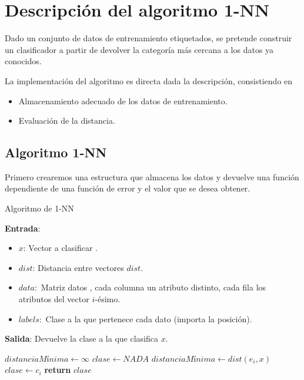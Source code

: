 \section{ Descripción del algoritmo 1-NN}

Dado un conjunto de datos de entrenamiento etiquetados, se pretende construir un clasificador 
a partir de devolver la categoría más cercana a los datos ya conocidos. 

La implementación del algoritmo es directa dada la descripción, consistiendo en 

\begin{itemize}
    \item Almacenamiento adecuado de los datos de entrenamiento.
    \item Evaluación de la distancia.
\end{itemize}

\subsection{Algoritmo 1-NN}

Primero crearemos una estructura que almacena los datos y devuelve
una función dependiente de una función de error 
y el valor que se desea obtener.

\begin{algorithm}
    \caption{Algoritmo de  1-NN}\label{euclid}
    \hspace*{\algorithmicindent} 
        \textbf{Entrada}:
        \begin{itemize}
            \item $x$: Vector a clasificar .
            \item $dist$: Distancia entre vectores $dist$.
            \item $data:$ Matriz  datos , cada columna un atributo distinto, cada fila los atributos del vector $i$-ésimo.
            \item $labels:$ Clase a la que pertenece cada dato (importa la posición).
        \end{itemize}
        \hspace*{\algorithmicindent} 
        \textbf{Salida}:
    Devuelve la clase a la que clasifica $x$.        
    \begin{algorithmic}[1]
          \State $distanciaMínima \gets\infty$
          \State $clase \leftarrow NADA$
                \State $distanciaMínima \gets dist(e_i, x)$
                \State $clase  \gets c_i$
            \EndIf
        \EndFor
        \State \textbf{return} $clase$
      \EndProcedure
    \end{algorithmic}
  \end{algorithm}
